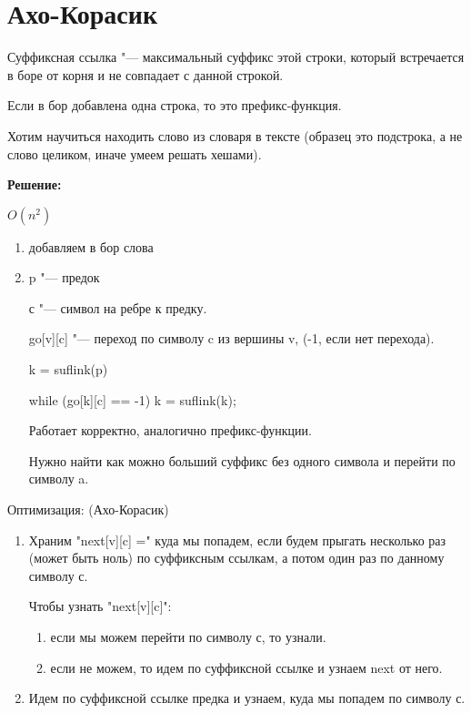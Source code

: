 \section{Ахо-Корасик}
\begin{Def}
Суффиксная ссылка "--- максимальный суффикс этой строки, 
который встречается в боре от корня и не совпадает с данной строкой. 
\end{Def}

Если в бор добавлена одна строка, то это префикс-функция. 

Хотим научиться находить слово из словаря в тексте (образец это подстрока, а не 
слово целиком, иначе умеем решать хешами). 

\textbf{Решение:}

$O(n^2)$
\begin{enumerate}
\item добавляем в бор слова 
\item p "--- предок

с "--- символ на ребре к предку. 

go[v][c] "--- переход по символу c из вершины v, (-1, если нет перехода). 

\begin{cppcode}
k = suflink(p)

while (go[k][c] == -1)
    k = suflink(k);
\end{cppcode}

Работает корректно, аналогично префикс-функции. 

Нужно найти как можно больший суффикс без одного символа и перейти по символу a.
\end{enumerate}

Оптимизация: (Ахо-Корасик)

\begin{enumerate}
\item Храним \cpp"next[v][c] =" куда мы попадем, если будем прыгать несколько раз (может быть ноль) по 
суффиксным ссылкам, а потом один раз по данному символу с.


Чтобы узнать \cpp"next[v][c]": 
    \begin{enumerate}
    \item если мы можем перейти по символу с, то узнали.
    \item если не можем, то идем по суффиксной ссылке и узнаем next от него.
    \end{enumerate}
\item Идем по суффиксной ссылке предка и узнаем, куда мы попадем по символу с.
\end{enumerate}

